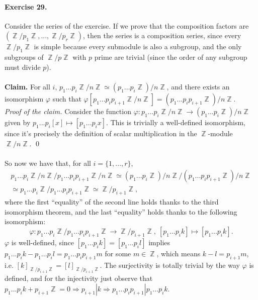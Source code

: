 \documentclass[12pt,a4paper]{report}
\theoremstyle{definition}
\theoremstyle{num.custom-title}
\DeclareMathOperator{\Z}{\mathbb{Z}}
\DeclareMathOperator{\imp}{\Rightarrow}
\renewcommand{\phi}{\varphi}
\begin{document}
\paragraph{Exercise 29.} Consider the series of the exercise. If we prove that the composition factors are $(\Z/p_1\Z, ..., \Z/p_r\Z)$, then the series is a composition series, since every $\Z/p_1\Z$ is simple because every submodule is also a subgroup, and the only subgroups of $\Z/p\Z$ with $p$ prime are trivial (since the order of any subgroup must divide $p$).\\
\\
\noindent\textbf{Claim.} For all $i$, $p_1...p_i \Z/n\Z \simeq (p_1...p_i\Z)/n\Z$, and there exists an isomorphism $\phi$ such that $\phi[p_1...p_i p_{i+1} \Z/n\Z] = (p_1...p_i p_{i+1} \Z)/n\Z$.\\
\emph{Proof of the claim.} Consider the function $\phi: p_1...p_i \Z/n\Z \to (p_1...p_i\Z)/n\Z$ given by $p_1...p_i [x] \mapsto [p_1...p_i x]$. This is trivially a well-defined isomorphism, since it's precisely the definition of scalar multiplication in the $\Z$-module $\Z/n\Z$. \qed
\\
\\
So now we have that, for all $i=\{1,...,r\}$, 
\begin{multline*}
p_1...p_i \Z/n\Z / p_1...p_i p_{i+1} \Z/n\Z \simeq (p_1...p_i \Z)/n\Z / (p_1...p_i p_{i+1} \Z)/n\Z \\
\simeq p_1...p_i \Z / p_1...p_i p_{i+1} \Z \simeq \Z/p_{i+1}\Z,
\end{multline*}
where the first ``equality'' of the second line holds thanks to the third isomorphism theorem, and the last ``equality'' holds thanks to the following isomorphism:
\[
\phi: p_1...p_i \Z / p_1...p_i p_{i+1} \Z \to \Z/p_{i+1}\Z, \ [p_1...p_i k] \mapsto [p_1...p_i k].
\]
$\phi$ is well-defined, since $[p_1...p_i k] = [p_1...p_i l]$ implies $p_1...p_i k - p_1...p_i l = p_1...p_i p_{i+1} m$ for some $m \in \Z$, which means $k-l=p_{i+1} m$, i.e. $[k]_{\Z/p_{i+1}\Z} = [l]_{\Z/p_{i+1}\Z}$. The surjectivity is totally trivial by the way $\phi$ is defined, and for the injectivity just observe that $p_1...p_i k + p_{i+1}\Z = 0 \imp p_{i+1}|k \imp p_1...p_i p_{i+1} | p_1...p_i k$.
\end{document}
